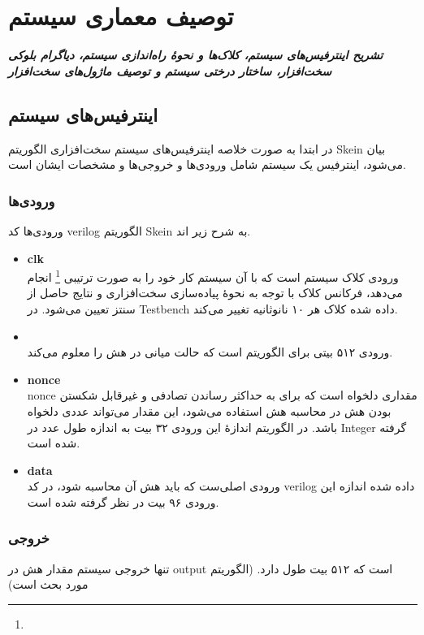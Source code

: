 \chapter{توصیف معماری سیستم}
\noindent
\textbf{
	\textit{
		تشریح اینترفیس‌های سیستم، کلاک‌ها و نحوهٔ راه‌اندازی سیستم، دیاگرام بلوکی سخت‌افزار، ساختار درختی سیستم و توصیف ماژول‌های سخت‌افزار 
	}
}
\pagebreak

\section{ اینترفیس‌های سیستم}
در ابتدا به صورت خلاصه اینترفیس‌های سیستم سخت‌افزاری الگوریتم Skein بیان می‌شود، اینترفیس یک سیستم شامل ورودی‌ها و خروجی‌ها و مشخصات ایشان است. 
\subsection{ورودی‌ها}
ورودی‌ها کد verilog الگوریتم Skein به شرح زیر اند.
\begin{itemize}
	\item
	      \textbf{clk}\\
	      ورودی کلاک سیستم است که با آن سیستم کار خود را به صورت ترتیبی 
	      \footnote{}
	      انجام می‌دهد، فرکانس کلاک با توجه به نحوهٔ پیاده‌سازی سخت‌افزاری و نتایج حاصل از سنتز تعیین می‌شود. در Testbench داده شده کلاک هر ۱۰ نانوثانیه تغییر می‌کند.
	\item
	      \textbf{}\\
	      ورودی ۵۱۲ بیتی برای الگوریتم
	      است که حالت میانی در هش را معلوم می‌کند.
	\item
	      \textbf{nonce}\\
	      nonce مقداری دلخواه است که برای به حداکثر رساندن تصادفی  و غیرقابل شکستن بودن هش 
	      در محاسبه هش استفاده می‌شود، این مقدار می‌تواند عددی دلخواه باشد. در الگوریتم 
	      اندازهٔ این ورودی ۳۲ بیت به اندازه طول عدد در Integer گرفته شده است.
	\item
	      \textbf{data}\\
	      ورودی اصلی‌ست که باید هش آن محاسبه شود، در کد verilog داده شده اندازه این ورودی ۹۶ بیت در نظر گرفته شده است. 
\end{itemize}

\subsection{خروجی}
تنها خروجی سیستم مقدار هش در output است که ۵۱۲ بیت طول دارد.
(الگوریتم مورد بحث 
است)

